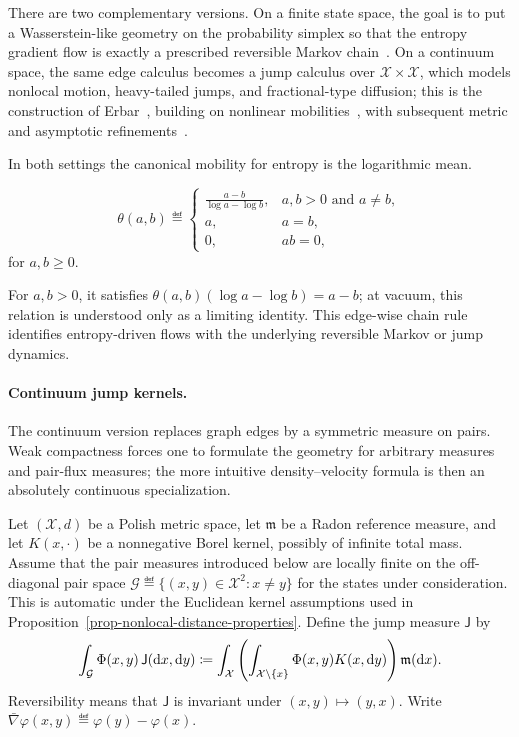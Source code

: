 There are two complementary versions. On a finite state space, the goal is to put a Wasserstein-like geometry on the probability simplex so that the entropy gradient flow is exactly a prescribed reversible Markov chain~\cite{Maas2011,MielkeCVPDE,ChowHuangLiZhou2012}. On a continuum space, the same edge calculus becomes a jump calculus over \(\mathcal X\times\mathcal X\), which models nonlocal motion, heavy-tailed jumps, and fractional-type diffusion; this is the construction of Erbar~\cite{Erbar2012JumpEntropy}, building on nonlinear mobilities~\cite{dolbeault2009new}, with subsequent metric and asymptotic refinements~\cite{SlepcevWarren2022NonlocalWasserstein}.

In both settings the canonical mobility for entropy is the logarithmic mean.
\begin{defn}\label{def-logarithmic-mean}
\begin{equation}\label{eq-logarithmic-mean}
\theta(a,b)\eqdef
\begin{cases}
\displaystyle\frac{a-b}{\log a-\log b}, & a,b>0\text{ and }a\neq b,\\[.4em]
a, & a=b,\\
0, & ab=0,
\end{cases}
\end{equation}
for $a,b\geq0$.
\end{defn}
For $a,b>0$, it satisfies \(\theta(a,b)(\log a-\log b)=a-b\); at vacuum, this relation is understood only as a limiting identity. This edge-wise chain rule identifies entropy-driven flows with the underlying reversible Markov or jump dynamics.

\paragraph{Continuum jump kernels.}
The continuum version replaces graph edges by a symmetric measure on pairs. Weak compactness forces one to formulate the geometry for arbitrary measures and pair-flux measures; the more intuitive density--velocity formula is then an absolutely continuous specialization.

Let $(\mathcal X,d)$ be a Polish metric space, let $\mathfrak m$ be a Radon reference measure, and let $K(x,\cdot)$ be a nonnegative Borel kernel, possibly of infinite total mass. Assume that the pair measures introduced below are locally finite on the off-diagonal pair space $\mathcal G\eqdef\{(x,y)\in\mathcal X^2:x\neq y\}$ for the states under consideration. This is automatic under the Euclidean kernel assumptions used in Proposition~\ref{prop-nonlocal-distance-properties}. Define the jump measure $\mathsf J$ by
\begin{equation}\label{eq-nonlocal-jump-measure}
	\int_{\mathcal G}\Phi(x,y)\,\mathsf J(\mathrm{d} x,\mathrm{d} y)
	\coloneqq
	\int_{\mathcal X}\left(\int_{\mathcal X\setminus\{x\}}\Phi(x,y)K(x,\mathrm{d} y)\right)\mathfrak m(\mathrm{d} x).
\end{equation}
Reversibility means that $\mathsf J$ is invariant under $(x,y)\mapsto(y,x)$. Write $\bar\nabla\varphi(x,y)\eqdef\varphi(y)-\varphi(x)$.


